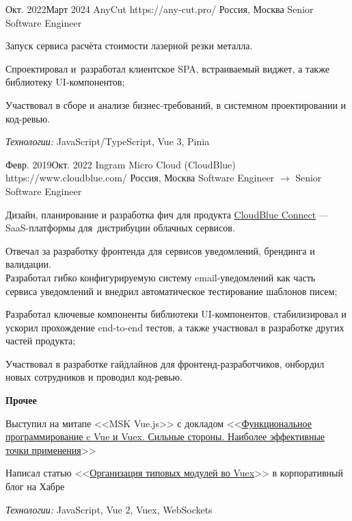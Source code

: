 \documentclass[10pt]{article}
\begin{document}
\job
	{Окт. 2022}{Март 2024}
	{AnyCut}
	{https://any-cut.pro/}
	{Россия, Москва}
	{Senior Software Engineer}
	{
	  Запуск сервиса расчёта стоимости лазерной резки металла.

	  \begin{supercompactitemize}
		\item Спроектировал и~разработал клиентское SPA, встраиваемый виджет, а также библиотеку \mbox{UI-компонентов};
		\item Участвовал в сборе и анализе бизнес-требований, в системном проектировании и код-ревью.
	  \end{supercompactitemize}

	  \textit{Технологии:} JavaScript/TypeScript, Vue 3, Pinia
	}

\job
	{Февр. 2019}{Окт. 2022}
	{Ingram Micro Cloud (CloudBlue)}
	{https://www.cloudblue.com/}
	{Россия, Москва}
	{Software Engineer $\rightarrow$ Senior Software Engineer}
	{
	  Дизайн, планирование и разработка фич для продукта \href{https://connect.cloudblue.com/community/}{CloudBlue Connect} --- SaaS-платформы для~дистрибуции облачных сервисов.

	  \begin{supercompactitemize}
		\item Отвечал за разработку фронтенда для сервисов уведомлений, брендинга и валидации. \\ Разработал гибко конфигурируемую систему email-уведомлений как часть сервиса уведомлений и внедрил автоматическое тестирование шаблонов писем;
		\item Разработал ключевые компоненты библиотеки UI-компонентов, стабилизировал и ускорил прохождение end-to-end тестов, а также участвовал в разработке других частей продукта;
		\item Участвовал в разработке гайдлайнов для фронтенд-разработчиков, онбордил новых сотрудников и проводил код-ревью.
	  \end{supercompactitemize}

	  \textbf{Прочее}

	  \begin{supercompactitemize}
	  	\item Выступил на митапе <<MSK Vue.js>> с докладом <<\href{https://www.youtube.com/watch?v=Rz_RynHNZKg}{Функциональное программирование c Vue и Vuex. Сильные стороны. Наиболее эффективные точки применения}>>
		\item Написал статью <<\href{https://habr.com/ru/company/odin_ingram_micro/blog/526094/}{Организация типовых модулей во Vuex}>> в корпоративный блог на Хабре
	  \end{supercompactitemize}

	  \textit{Технологии:} JavaScript, Vue 2, Vuex, WebSockets
	}
\end{document}

